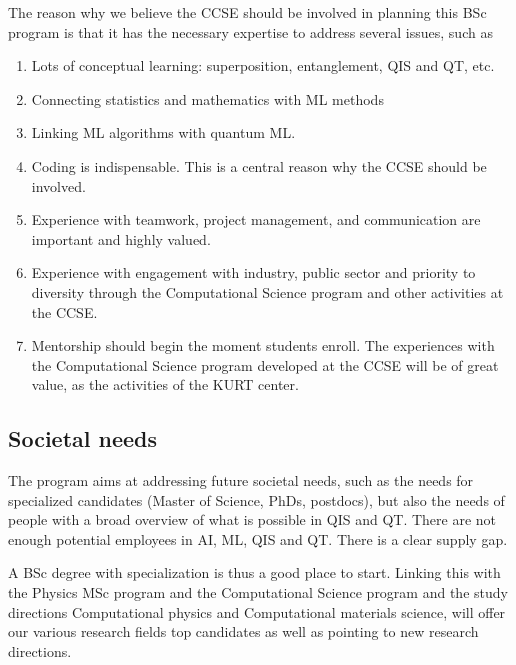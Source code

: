 \documentclass[%
oneside,                 %
final,                   %
10pt]{article}
\begin{document}
\vspace{6mm}

The reason why we believe the CCSE should be involved in planning this BSc program is that it has the necessary expertise to address several issues, such as

\begin{enumerate}
\item Lots of conceptual learning: superposition, entanglement, QIS and QT, etc. 

\item Connecting statistics and mathematics with ML methods

\item Linking ML algorithms with quantum ML.

\item Coding is indispensable. This is a central reason why the CCSE should be involved.

\item Experience with teamwork, project management, and communication are important and highly valued.

\item Experience with engagement with industry, public sector and priority to diversity through the Computational Science program and other activities at the CCSE.

\item Mentorship should begin the moment students enroll. The experiences with the Computational Science program developed at the CCSE will be of great value, as the activities of the KURT center.
\end{enumerate}

\noindent
\subsection{Societal needs}

The program aims at addressing future societal needs, such as the
needs for specialized candidates (Master of Science, PhDs, postdocs),
but also the needs of people with a broad overview of what is possible
in QIS and QT. There are not enough potential employees in AI, ML, QIS
and QT. There is a clear supply gap.

A BSc degree with specialization is thus a good place to
start. Linking this with the Physics MSc program and the Computational
Science program and the study directions Computational physics and
Computational materials science, will offer our various research
fields top candidates as well as pointing to new research directions.
\end{document}
